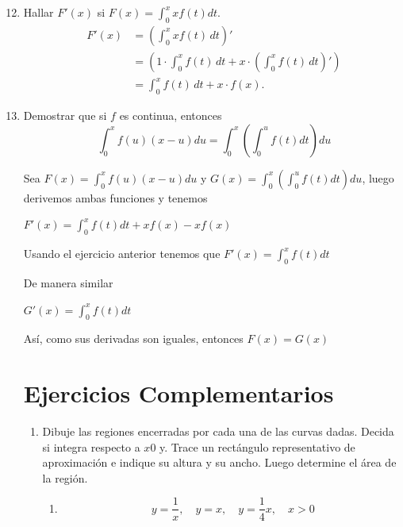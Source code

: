 \documentclass{report}
\begin{document}
\begin{enumerate}[label=\textcolor{Red}{\textbf{\arabic*.}}]
        \setcounter{enumi}{11}
        \item Hallar  $F'(x)$ si $F(x)=\int_{0 }^{x}xf(t)dt$.
        \begin{align*}
            F'(x) &= \left( \int_{0}^{x} xf(t) \, dt \right)' \\
            &= \left( 1 \cdot \int_{0}^{x} f(t) \, dt + x \cdot \left( \int_{0}^{x} f(t) \, dt \right)' \right) \\
            &= \int_{0}^{x} f(t) \, dt + x \cdot f(x).
        \end{align*}

        \item Demostrar que si $f$ es continua, entonces
        $$\int_{0}^{x}f(u)(x-u)du=\int_{0}^{x}\left( \int_{0}^{u}f(t)dt\right) du$$

        Sea $F(x) = \int_{0}^{x}f(u)(x-u)du$ y $G(x) = \int_{0}^{x}\left( \int_{0}^{u}f(t)dt\right) du$, luego derivemos ambas funciones y tenemos

        $F'(x) = \int_{0 }^{x}f(t)dt+x f(x)- xf(x)$

        Usando el ejercicio anterior tenemos que $F'(x) = \int_{0}^{x}f(t)dt$

        De manera similar

        $G'(x) = \int_{0}^{x}f(t)dt$

        Así, como sus derivadas son iguales, entonces $F(x) = G(x)$\pagebreak

        \section*{\textcolor{OliveGreen}{Ejercicios Complementarios}}

        \begin{enumerate}[label=\textcolor{OliveGreen}{\textbf{\arabic*.}}]
            \item Dibuje las regiones encerradas por cada una de las curvas dadas. Decida si integra respecto a $x 0$ y. Trace un rectángulo representativo de aproximación e indique su altura y su ancho. Luego determine el área de la región.
            \begin{enumerate}[label=\textcolor{OliveGreen}{\textbf{\roman*.}}]
                \item $$
                y=\frac{1}{x}, \quad y=x, \quad y=\frac{1}{4} x, \quad x>0
                $$


\end{enumerate}
\end{enumerate}
\end{enumerate}
\end{document}
